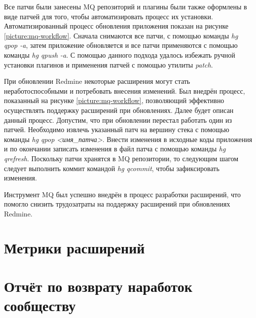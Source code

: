 Все патчи были занесены MQ репозиторий и плагины были также оформлены в виде
патчей для того, чтобы автоматизировать процесс их установки.
Автоматизированный процесс обновления приложения показан на рисунке
\ref{picture:mq-workflow}. Сначала снимаются все патчи, с помощью команды
\textit{hg qpop -a}, затем приложение обновляется и все патчи применяются с
помощью команды \textit{hg qpush -a}. С помощью данного подхода удалось
избежать ручной установки плагинов и применения патчей с помощью утилиты
\textit{patch}.

При обновлении Redmine некоторые расширения могут стать неработоспособными и
потребовать внесения изменений. Был внедрён процесс, показанный на рисунке
\ref{picture:mq-workflow}, позволяющий эффективно осуществлять поддержку
расширений при обновлениях. Далее будет описан данный процесс. Допустим, что
при обновлении перестал работать один из патчей. Необходимо извлечь указанный
патч на вершину стека с помощью команды \textit{hg qpop <имя\_патча>}. Внести
изменения в исходные коды приложения и по окончании записать изменения в файл
патча с помощью команды \textit{hg qrefresh}. Поскольку патчи хранятся в MQ
репозитории, то следующим шагом следует выполнить коммит командой \textit{hg
qcommit}, чтобы зафиксировать изменения.


Инструмент MQ был успешно внедрён в процесс разработки расширений, что помогло
снизить трудозатраты на поддержку расширений при обновлениях Redmine.

\section{Метрики расширений}
\section{Отчёт по возврату наработок сообществу}



